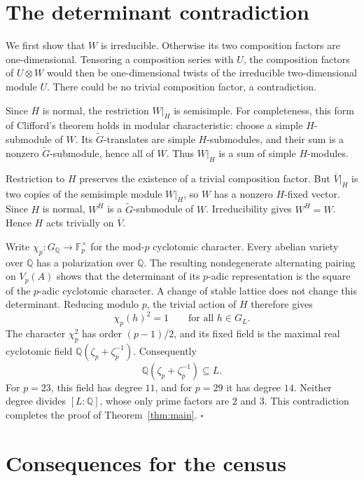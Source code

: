 \documentclass[11pt]{article}
\newcommand{\Q}{\mathbb Q}
\newcommand{\F}{\mathbb F}
\begin{document}
\section{The determinant contradiction}

We first show that \(W\) is irreducible. Otherwise its two composition
factors are one-dimensional. Tensoring a composition series with
\(U\), the composition factors of \(U\otimes W\) would then be
one-dimensional twists of the irreducible two-dimensional module
\(U\). There could be no trivial composition factor, a
contradiction.

Since \(H\) is normal, the restriction \(W|_H\) is semisimple.
For completeness, this form of Clifford's theorem holds in modular
characteristic: choose a simple \(H\)-submodule of \(W\). Its
\(\widetilde G\)-translates are simple \(H\)-submodules, and their
sum is a nonzero \(\widetilde G\)-submodule, hence all of \(W\).
Thus \(W|_H\) is a sum of simple \(H\)-modules.

Restriction to \(H\) preserves the existence of a trivial
composition factor. But \(\overline V|_H\) is two copies of the
semisimple module \(W|_H\), so \(W\) has a nonzero \(H\)-fixed
vector. Since \(H\) is normal, \(W^H\) is a
\(\widetilde G\)-submodule of \(W\). Irreducibility gives
\(W^H=W\). Hence \(H\) acts trivially on \(\overline V\).

Write \(\chi_p:G_{\Q}\to\F_p^\times\) for the mod-\(p\)
cyclotomic character. Every abelian variety over \(\Q\) has a
polarization over \(\Q\). The resulting nondegenerate alternating
pairing on \(V_p(A)\) shows that the determinant of its
\(p\)-adic representation is the square of the \(p\)-adic
cyclotomic character. A change of stable lattice does not change
this determinant. Reducing modulo \(p\), the trivial action of
\(H\) therefore gives
\[
 \chi_p(h)^2=1\qquad\text{for all }h\in G_L.
\]
The character \(\chi_p^2\) has order \((p-1)/2\), and its fixed field
is the maximal real cyclotomic field
\(\Q(\zeta_p+\zeta_p^{-1})\). Consequently
\[
 \Q(\zeta_p+\zeta_p^{-1})\subseteq L.
\]
For \(p=23\), this field has degree \(11\), and for \(p=29\) it has
degree \(14\). Neither degree divides \([L:\Q]\), whose only prime
factors are \(2\) and \(3\). This contradiction completes the proof
of Theorem~\ref{thm:main}.
\hfill\(\square\)

\section{Consequences for the census}
\end{document}
